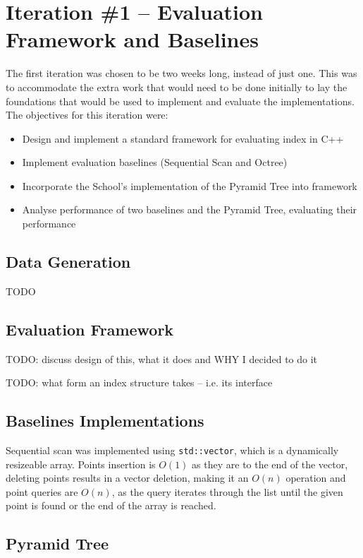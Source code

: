 \section{Iteration \#1 -- Evaluation Framework and Baselines}

The first iteration was chosen to be two weeks long, instead of just one. This was to accommodate the extra work that would need to be done initially to lay the foundations that would be used to implement and evaluate the implementations. The objectives for this iteration were:
\begin{itemize}
	\item Design and implement a standard framework for evaluating index  in C++
	\item Implement evaluation baselines (Sequential Scan and Octree)
	\item Incorporate the School's implementation of the Pyramid Tree into framework
	\item Analyse performance of two baselines and the Pyramid Tree, evaluating their performance
\end{itemize}

\subsection{Data Generation}

TODO

\subsection{Evaluation Framework}

TODO: discuss design of this, what it does and WHY I decided to do it

TODO: what form an index structure takes -- i.e. its interface

\subsection{Baselines Implementations}

Sequential scan was implemented using \texttt{std::vector}, which is a dynamically resizeable array. Points insertion is $O(1)$ as they are to the end of the vector, deleting points results in a vector deletion, making it an $O(n)$ operation and point queries are $O(n)$, as the query iterates through the list until the given point is found or the end of the array is reached.

\subsection{Pyramid Tree}

